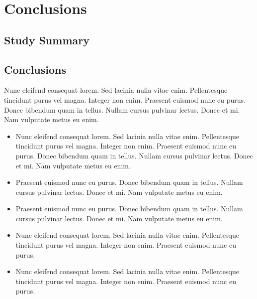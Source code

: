 
\chapter{Conclusions}\doublespacing %

\label{Chapter4} %




\section{Study Summary}
\lipsum[1-4]


\section{Conclusions}
Nunc eleifend consequat lorem. Sed lacinia nulla vitae enim. Pellentesque tincidunt purus vel magna. Integer non enim. Praesent euismod nunc eu purus. Donec bibendum quam in tellus. Nullam cursus pulvinar lectus. Donec et mi. Nam vulputate metus eu enim.

\begin{itemize}

  \item Nunc eleifend consequat lorem. Sed lacinia nulla vitae enim. Pellentesque tincidunt purus vel magna. Integer non enim. Praesent euismod nunc eu purus. Donec bibendum quam in tellus. Nullam cursus pulvinar lectus. Donec et mi. Nam vulputate metus eu enim.
  
  \item Praesent euismod nunc eu purus. Donec bibendum quam in tellus. Nullam cursus pulvinar lectus. Donec et mi. Nam vulputate metus eu enim.
  
  \item Praesent euismod nunc eu purus. Donec bibendum quam in tellus. Nullam cursus pulvinar lectus. Donec et mi. Nam vulputate metus eu enim.
  
  \item Nunc eleifend consequat lorem. Sed lacinia nulla vitae enim. Pellentesque tincidunt purus vel magna. Integer non enim. Praesent euismod nunc eu purus.
  
  \item Nunc eleifend consequat lorem. Sed lacinia nulla vitae enim. Pellentesque tincidunt purus vel magna. Integer non enim. Praesent euismod nunc eu purus.
  
\end{itemize}
    

